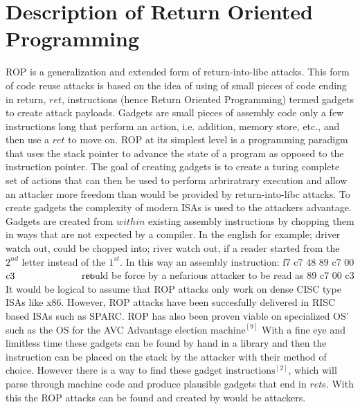 \documentclass[11pt]{amsart}
\newcommand{\tab}[1]{\hspace{.2\textwidth}\rlap{#1}}
\begin{document}
\section*{Description of Return Oriented Programming}
ROP is a generalization and extended form of return-into-libc attacks. This form of code reuse attacks is based on the idea of using of small pieces of code ending in return, $ret$, instructions (hence Return Oriented Programming) termed gadgets to create attack payloads. Gadgets are small pieces of assembly code only a few instructions long that perform an action, i.e. addition, memory store, etc., and then use a $ret$ to move on. ROP at its simplest level is a programming paradigm that uses the stack pointer to advance the state of a program as opposed to the instruction pointer. The goal of creating gadgets is to create a turing complete set of actions that can then be used to perform arbriratrary execution and allow an attacker more freedom than would be provided by return-into-libc attacks. \newline \newline
To create gadgets the complexity of modern ISAs is used to the attackers advantage.  Gadgets are created from $within$ existing assembly instructions by chopping them in ways that are not expected by a compiler.  In the english for example; driver watch out, could be chopped into; river watch out, if a reader started from the $2^{nd}$ letter instead of the $1^{st}$.  In this way an assembly instruction: \newline f7 c7 48 89 c7 00 \tab{test \$0x00c78948, \%edi} \newline$c3\tab{ret}$ \newline could be force by a nefarious attacker to be read as  89 c7 \tab{mov \%rax,\%rdi} \newline$00$ \newline c3 \tab{ret} \newline 
It would be logical to assume that ROP attacks only work on dense CISC type ISAs like x86.  However, ROP attacks have been succesfully delivered in RISC based ISAs such as SPARC.  ROP has also been proven viable on specialized OS' such as the OS for the AVC Advantage election $\text{machine}^{[9]}$ \newline \newline
With a fine eye and limitless time these gadgets can be found by hand in a library and then the instruction can be placed on the stack by the attacker with their method of choice.  However there is a way to find these gadget $\text{instructions}^{[2]}$, which will parse through machine code and produce plausible gadgets that end in $ret$s.  With this the ROP attacks can be found and created by would be attackers. \newline \newline
\end{document}
